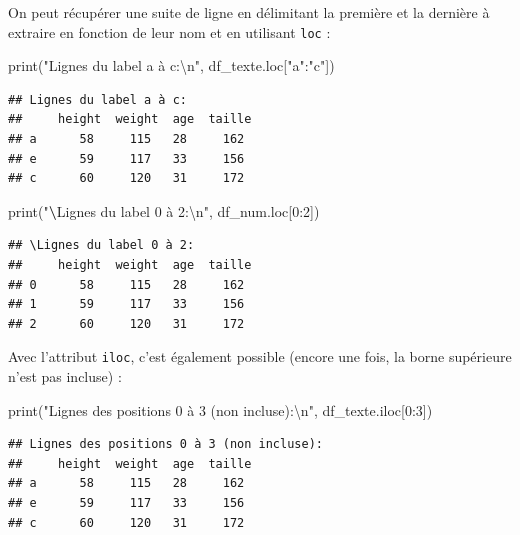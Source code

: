 \documentclass[
  12pt,
]{book}
\newenvironment{Shaded}{\begin{snugshade}}{\end{snugshade}}
\newcommand{\BuiltInTok}[1]{#1}
\newcommand{\CharTok}[1]{\textcolor[rgb]{0.31,0.60,0.02}{#1}}
\newcommand{\DecValTok}[1]{\textcolor[rgb]{0.00,0.00,0.81}{#1}}
\newcommand{\ErrorTok}[1]{\textcolor[rgb]{0.64,0.00,0.00}{\textbf{#1}}}
\newcommand{\NormalTok}[1]{#1}
\newcommand{\StringTok}[1]{\textcolor[rgb]{0.31,0.60,0.02}{#1}}
\numberwithin{equation}{section}
\numberwithin{countremarque}{section}
\begin{document}
On peut récupérer une suite de ligne en délimitant la première et la dernière à extraire en fonction de leur nom et en utilisant \texttt{loc} :

\begin{Shaded}
\begin{Highlighting}[]
\BuiltInTok{print}\NormalTok{(}\StringTok{"Lignes du label a à c:}\CharTok{\textbackslash{}n}\StringTok{"}\NormalTok{, df\_texte.loc[}\StringTok{"a"}\NormalTok{:}\StringTok{"c"}\NormalTok{])}
\end{Highlighting}
\end{Shaded}

\begin{lstlisting}
## Lignes du label a à c:
##     height  weight  age  taille
## a      58     115   28     162
## e      59     117   33     156
## c      60     120   31     172
\end{lstlisting}

\begin{Shaded}
\begin{Highlighting}[]
\BuiltInTok{print}\NormalTok{(}\StringTok{"}\ErrorTok{\textbackslash{}}\StringTok{Lignes du label 0 à 2:}\CharTok{\textbackslash{}n}\StringTok{"}\NormalTok{, df\_num.loc[}\DecValTok{0}\NormalTok{:}\DecValTok{2}\NormalTok{])}
\end{Highlighting}
\end{Shaded}

\begin{lstlisting}
## \Lignes du label 0 à 2:
##     height  weight  age  taille
## 0      58     115   28     162
## 1      59     117   33     156
## 2      60     120   31     172
\end{lstlisting}

Avec l'attribut \texttt{iloc}, c'est également possible (encore une fois, la borne supérieure n'est pas incluse) :

\begin{Shaded}
\begin{Highlighting}[]
\BuiltInTok{print}\NormalTok{(}\StringTok{"Lignes des positions 0 à 3 (non incluse):}\CharTok{\textbackslash{}n}\StringTok{"}\NormalTok{, df\_texte.iloc[}\DecValTok{0}\NormalTok{:}\DecValTok{3}\NormalTok{])}
\end{Highlighting}
\end{Shaded}

\begin{lstlisting}
## Lignes des positions 0 à 3 (non incluse):
##     height  weight  age  taille
## a      58     115   28     162
## e      59     117   33     156
## c      60     120   31     172
\end{lstlisting}
\end{document}
